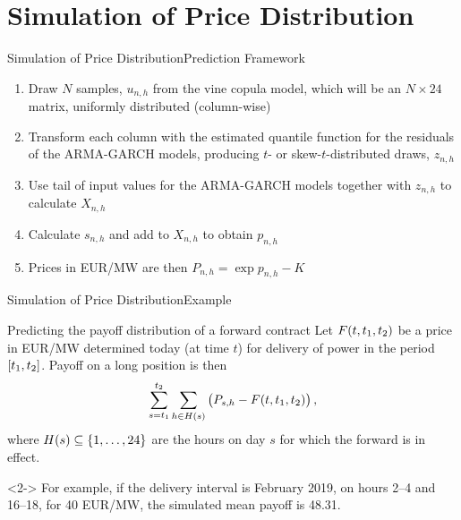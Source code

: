 \section{Simulation of Price Distribution}
\label{sec:simulation}

\begin{frame}{Simulation of Price Distribution}{Prediction Framework}
  \begin{enumerate}
  \item<2-> Draw \(N\) samples, \(u_{n,h}\) from the vine copula model, which will be an \(N \times 24\) matrix, uniformly distributed (column-wise)
  \item<3-> Transform each column with the estimated quantile function for the residuals of the ARMA-GARCH models, producing \(t\)- or skew-\(t\)-distributed draws, \(z_{n,h}\)
  \item<4-> Use tail of input values for the ARMA-GARCH models together with \(z_{n,h}\) to calculate \(X_{n,h}\)
  \item<5-> Calculate \(s_{n,h}\) and add to \(X_{n,h}\) to obtain \(p_{n,h}\)
  \item<6-> Prices in EUR/MW are then \(P_{n,h} = \exp p_{n,h} - K\)
  \end{enumerate}
\end{frame}

\begin{frame}{Simulation of Price Distribution}{Example}
  \begin{block}{Predicting the payoff distribution of a forward contract}
    Let \(F\of{t, t_{1}, t_{2}}\) be a price in EUR/MW determined today (at time \(t\)) for delivery of power in the period \(\intcc{t_{1}, t_{2}}\).
    Payoff on a long position is then
    \begin{equation*}
      \sum_{s=t_{1}}^{t_{2}} \sum_{h\in H(s)} \del{P_{s,h} - F\of{t, t_{1}, t_{2}}},
    \end{equation*}
    where \(H(s) \subseteq \cbr{1,\dotsc,24}\) are the hours on day \(s\) for which the forward is in effect.
  \end{block}

  \begin{block}{}<2->
    For example, if the delivery interval is February 2019, on hours 2--4 and 16--18, for 40 EUR/MW, the simulated mean payoff is 48.31.
  \end{block}
\end{frame}


